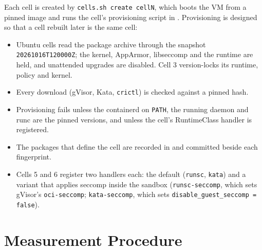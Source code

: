 Each cell is created by \texttt{cells.sh create cellN}, which boots the VM from a pinned image and runs the cell's provisioning script in . Provisioning is designed so that a cell rebuilt later is the same cell:
\begin{itemize}[leftmargin=*]
\item Ubuntu cells read the package archive through the snapshot \texttt{20261016T120000Z}; the kernel, AppArmor, libseccomp and the runtime are held, and unattended upgrades are disabled. Cell 3 version-locks its runtime, policy and kernel.
\item Every download (gVisor, Kata, \texttt{crictl}) is checked against a pinned hash.
\item Provisioning fails unless the containerd on \texttt{PATH}, the running daemon and runc are the pinned versions, and unless the cell's RuntimeClass handler is registered.
\item The packages that define the cell are recorded in  and committed beside each fingerprint.
\item Cells 5 and 6 register two handlers each: the default (\texttt{runsc}, \texttt{kata}) and a variant that applies seccomp inside the sandbox (\texttt{runsc-seccomp}, which sets gVisor's \texttt{oci-seccomp}; \texttt{kata-seccomp}, which sets \texttt{disable\_guest\_seccomp = false}).
\end{itemize}

\section{Measurement Procedure}

